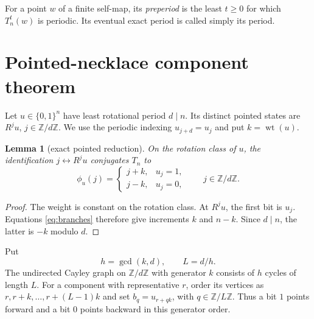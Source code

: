 \documentclass[a4paper,10pt]{amsart}
\newtheorem{lemma}[theorem]{Lemma}
\theoremstyle{remark}
\newcommand{\Z}{\mathbb Z}
\newcommand{\F}{\{0,1\}}
\newcommand{\wt}{\operatorname{wt}}
\newcommand{\1}{\mathbf 1}
\begin{document}
For a point $w$ of a finite self-map, its \emph{preperiod} is the least
$t\geq0$ for which $T_n^t(w)$ is periodic.  Its eventual exact period is
called simply its period.

\section{Pointed-necklace component theorem}

Let $u\in\F^n$ have least rotational period $d\mid n$.  Its distinct
pointed states are $R^ju$, $j\in\Z/d\Z$.  We use the periodic indexing
$u_{j+d}=u_j$ and put $k=\wt(u)$.

\begin{lemma}[exact pointed reduction]\label{lem:phase}
On the rotation class of $u$, the identification $j\leftrightarrow R^ju$
conjugates $T_n$ to
\begin{equation}\label{eq:phase}
 \phi_u(j)=
 \begin{cases}
 j+k,&u_j=1,\\
 j-k,&u_j=0,
 \end{cases}
 \qquad j\in\Z/d\Z.
\end{equation}
\end{lemma}

\begin{proof}
The weight is constant on the rotation class.  At $R^ju$, the first bit is
$u_j$.  Equations \eqref{eq:branches} therefore give increments $k$ and
$n-k$.  Since $d\mid n$, the latter is $-k$ modulo $d$.
\end{proof}

Put
\[
 h=\gcd(k,d),\qquad L=d/h.
\]
The undirected Cayley graph on $\Z/d\Z$ with generator $k$ consists of $h$
cycles of length $L$.  For a component with representative $r$, order its
vertices as $r,r+k,\ldots,r+(L-1)k$ and set
$b_q=u_{r+qk}$, with $q\in\Z/L\Z$.  Thus a bit $1$ points forward and a bit
$0$ points backward in this generator order.
\end{document}
